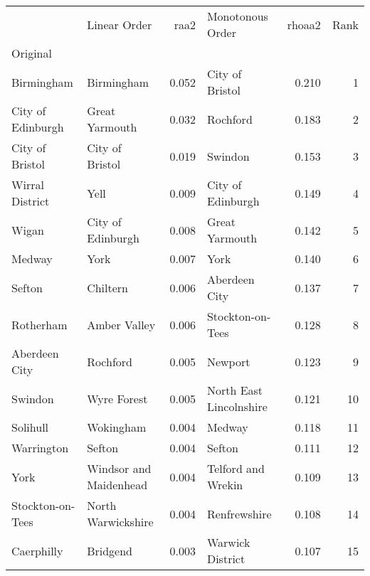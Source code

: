 \begin{tabular}{llrlrr}
\toprule
{} &               Linear Order &   raa2 &           Monotonous Order &  rhoaa2 &  Rank \\
Original                  &                            &        &                            &         &       \\
\midrule
Birmingham                &                 Birmingham &  0.052 &            City of Bristol &   0.210 &     1 \\
City of Edinburgh         &             Great Yarmouth &  0.032 &                   Rochford &   0.183 &     2 \\
City of Bristol           &            City of Bristol &  0.019 &                    Swindon &   0.153 &     3 \\
Wirral District           &                       Yell &  0.009 &          City of Edinburgh &   0.149 &     4 \\
Wigan                     &          City of Edinburgh &  0.008 &             Great Yarmouth &   0.142 &     5 \\
Medway                    &                       York &  0.007 &                       York &   0.140 &     6 \\
Sefton                    &                   Chiltern &  0.006 &              Aberdeen City &   0.137 &     7 \\
Rotherham                 &               Amber Valley &  0.006 &           Stockton-on-Tees &   0.128 &     8 \\
Aberdeen City             &                   Rochford &  0.005 &                    Newport &   0.123 &     9 \\
Swindon                   &                Wyre Forest &  0.005 &    North East Lincolnshire &   0.121 &    10 \\
Solihull                  &                  Wokingham &  0.004 &                     Medway &   0.118 &    11 \\
Warrington                &                     Sefton &  0.004 &                     Sefton &   0.111 &    12 \\
York                      &     Windsor and Maidenhead &  0.004 &         Telford and Wrekin &   0.109 &    13 \\
Stockton-on-Tees          &         North Warwickshire &  0.004 &               Renfrewshire &   0.108 &    14 \\
Caerphilly                &                   Bridgend &  0.003 &           Warwick District &   0.107 &    15 \\

\end{tabular}
